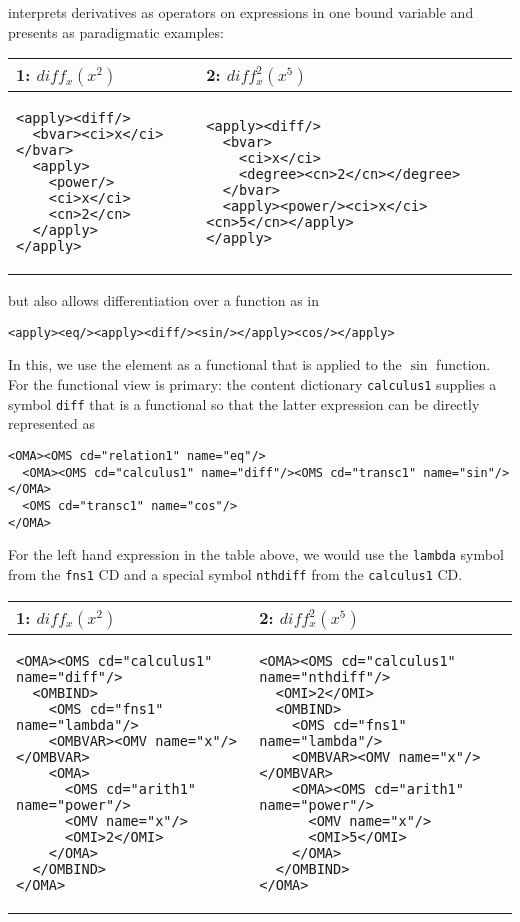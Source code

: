 \documentclass[12pt]{article}
\begin{document}
{\mathml} interprets derivatives as operators on expressions in one bound variable and
presents as paradigmatic examples:
\begin{center}\lstset{frame=none,numbers=none,lineskip=-.7ex,aboveskip=-.5em,belowskip=-1em,language=MathML}
\begin{tabular}{|p{4.5cm}|p{8cm}|}\hline
  1: $diff_x(x^2)$ & 2: $diff^2_x(x^5)$\\\hline
\begin{lstlisting}
<apply><diff/>
  <bvar><ci>x</ci></bvar>
  <apply>
    <power/>
    <ci>x</ci>
    <cn>2</cn>
  </apply>
</apply>
\end{lstlisting}
&
\begin{lstlisting}[language=MathML]
<apply><diff/>
  <bvar>
    <ci>x</ci>
    <degree><cn>2</cn></degree>
  </bvar>
  <apply><power/><ci>x</ci><cn>5</cn></apply>
</apply>
\end{lstlisting}
\\\hline
\end{tabular}
\end{center}
but also allows differentiation over a function as in 
\begin{lstlisting}[language=MathML]
<apply><eq/><apply><diff/><sin/></apply><cos/></apply>
\end{lstlisting}
In this, we use the {} element as a functional that is applied to the $\sin$
function. For {\openmath} the functional view is primary: the content dictionary
{\texttt{calculus1}} supplies a symbol {\texttt{diff}} that is a functional so that the
latter expression can be directly represented as 
\begin{lstlisting}[language=OpenMath]
<OMA><OMS cd="relation1" name="eq"/>
  <OMA><OMS cd="calculus1" name="diff"/><OMS cd="transc1" name="sin"/></OMA>
  <OMS cd="transc1" name="cos"/>
</OMA>
\end{lstlisting}
For the left hand expression in the table above, we would use the {\texttt{lambda}} symbol
from the {\texttt{fns1}} CD and a special symbol {\texttt{nthdiff}} from the
{\texttt{calculus1}} CD.
\begin{center}\lstset{frame=none,numbers=none,lineskip=-.7ex,aboveskip=-.5em,belowskip=-1em,language=OpenMath}
\begin{tabular}{|p{6.8cm}|p{7.3cm}|}\hline
  1: $diff_x(x^2)$ & 2: $diff^2_x(x^5)$\\\hline
\begin{lstlisting}
<OMA><OMS cd="calculus1" name="diff"/>
  <OMBIND>
    <OMS cd="fns1" name="lambda"/>
    <OMBVAR><OMV name="x"/></OMBVAR>
    <OMA>
      <OMS cd="arith1" name="power"/>
      <OMV name="x"/>
      <OMI>2</OMI>
    </OMA>
  </OMBIND>
</OMA>
\end{lstlisting}
&
\begin{lstlisting}[language=OpenMath]
<OMA><OMS cd="calculus1" name="nthdiff"/>
  <OMI>2</OMI>
  <OMBIND>
    <OMS cd="fns1" name="lambda"/>
    <OMBVAR><OMV name="x"/></OMBVAR>
    <OMA><OMS cd="arith1" name="power"/>
      <OMV name="x"/>
      <OMI>5</OMI>
    </OMA>
  </OMBIND>
</OMA>
\end{lstlisting}
\\\hline
\end{tabular}
\end{center}
\end{document}
